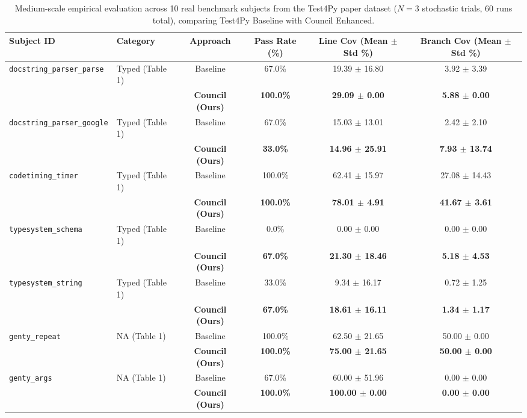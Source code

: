 \begin{table}[t]
\centering
\caption{Medium-scale empirical evaluation across 10 real benchmark subjects from the Test4Py paper dataset ($N=3$ stochastic trials, 60 runs total), comparing Test4Py Baseline with Council Enhanced.}
\label{tab:medium_scale_benchmark}
\small
\begin{tabular}{llcccc}
\toprule
\textbf{Subject ID} & \textbf{Category} & \textbf{Approach} & \textbf{Pass Rate (\%)} & \textbf{Line Cov (Mean $\pm$ Std \%)} & \textbf{Branch Cov (Mean $\pm$ Std \%)} \\
\midrule
\texttt{docstring\_parser\_parse} & Typed (Table 1) & Baseline & 67.0\% & 19.39 $\pm$ 16.80 & 3.92 $\pm$ 3.39 \\
 & & \textbf{Council (Ours)} & \textbf{100.0\%} & \textbf{29.09 $\pm$ 0.00} & \textbf{5.88 $\pm$ 0.00} \\
\midrule
\texttt{docstring\_parser\_google} & Typed (Table 1) & Baseline & 67.0\% & 15.03 $\pm$ 13.01 & 2.42 $\pm$ 2.10 \\
 & & \textbf{Council (Ours)} & \textbf{33.0\%} & \textbf{14.96 $\pm$ 25.91} & \textbf{7.93 $\pm$ 13.74} \\
\midrule
\texttt{codetiming\_timer} & Typed (Table 1) & Baseline & 100.0\% & 62.41 $\pm$ 15.97 & 27.08 $\pm$ 14.43 \\
 & & \textbf{Council (Ours)} & \textbf{100.0\%} & \textbf{78.01 $\pm$ 4.91} & \textbf{41.67 $\pm$ 3.61} \\
\midrule
\texttt{typesystem\_schema} & Typed (Table 1) & Baseline & 0.0\% & 0.00 $\pm$ 0.00 & 0.00 $\pm$ 0.00 \\
 & & \textbf{Council (Ours)} & \textbf{67.0\%} & \textbf{21.30 $\pm$ 18.46} & \textbf{5.18 $\pm$ 4.53} \\
\midrule
\texttt{typesystem\_string} & Typed (Table 1) & Baseline & 33.0\% & 9.34 $\pm$ 16.17 & 0.72 $\pm$ 1.25 \\
 & & \textbf{Council (Ours)} & \textbf{67.0\%} & \textbf{18.61 $\pm$ 16.11} & \textbf{1.34 $\pm$ 1.17} \\
\midrule
\texttt{genty\_repeat} & NA (Table 1) & Baseline & 100.0\% & 62.50 $\pm$ 21.65 & 50.00 $\pm$ 0.00 \\
 & & \textbf{Council (Ours)} & \textbf{100.0\%} & \textbf{75.00 $\pm$ 21.65} & \textbf{50.00 $\pm$ 0.00} \\
\midrule
\texttt{genty\_args} & NA (Table 1) & Baseline & 67.0\% & 60.00 $\pm$ 51.96 & 0.00 $\pm$ 0.00 \\
 & & \textbf{Council (Ours)} & \textbf{100.0\%} & \textbf{100.00 $\pm$ 0.00} & \textbf{0.00 $\pm$ 0.00} \\

\end{tabular}
\end{table}
